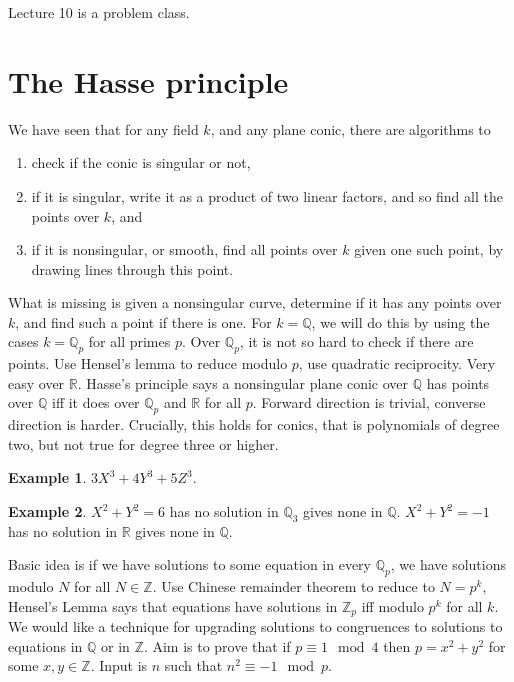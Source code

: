 \documentclass{article}
\newcommand{\Z}{\mathbb{Z}}
\newcommand{\Q}{\mathbb{Q}}
\newcommand{\R}{\mathbb{R}}
\theoremstyle{definition}\newtheorem{definition}{Definition}[section]
\theoremstyle{definition}\newtheorem{remark}[definition]{Remark}
\theoremstyle{definition}\newtheorem*{example}{Example}
\theoremstyle{definition}\newtheorem*{note}{Note}
\begin{document}
Lecture 10 is a problem class.


\section{The Hasse principle}

We have seen that for any field $ k $, and any plane conic, there are algorithms to
\begin{enumerate}
\item check if the conic is singular or not,
\item if it is singular, write it as a product of two linear factors, and so find all the points over $ k $, and
\item if it is nonsingular, or smooth, find all points over $ k $ given one such point, by drawing lines through this point.
\end{enumerate}
What is missing is given a nonsingular curve, determine if it has any points over $ k $, and find such a point if there is one. For $ k = \Q $, we will do this by using the cases $ k = \Q_p $ for all primes $ p $. Over $ \Q_p $, it is not so hard to check if there are points. Use Hensel's lemma to reduce modulo $ p $, use quadratic reciprocity. Very easy over $ \R $. Hasse's principle says a nonsingular plane conic over $ \Q $ has points over $ \Q $ iff it does over $ \Q_p $ and $ \R $ for all $ p $. Forward direction is trivial, converse direction is harder. Crucially, this holds for conics, that is polynomials of degree two, but not true for degree three or higher.

\begin{example}
$ 3X^3 + 4Y^3 + 5Z^3 $.
\end{example}

\begin{example}
$ X^2 + Y^2 = 6 $ has no solution in $ \Q_3 $ gives none in $ \Q $. $ X^2 + Y^2 = -1 $ has no solution in $ \R $ gives none in $ \Q $.
\end{example}

Basic idea is if we have solutions to some equation in every $ \Q_p $, we have solutions modulo $ N $ for all $ N \in \Z $. Use Chinese remainder theorem to reduce to $ N = p^k $, Hensel's Lemma says that equations have solutions in $ \Z_p $ iff modulo $ p^k $ for all $ k $. We would like a technique for upgrading solutions to congruences to solutions to equations in $ \Q $ or in $ \Z $. Aim is to prove that if $ p \equiv 1 \mod 4 $ then $ p = x^2 + y^2 $ for some $ x, y \in \Z $. Input is $ n $ such that $ n^2 \equiv -1 \mod p $.
\end{document}

